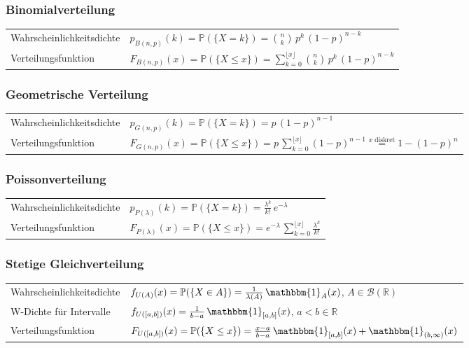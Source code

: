 \documentclass{article}
\begin{document}
\subsubsection*{Binomialverteilung}

\begin{tabular}{ll}
Wahrscheinlichkeitsdichte & $p_{B(n,p)}(k) = \mathbb{P}(\{X = k\}) = \binom{n}{k}\,p^k\,(1-p)^{n-k}$ \\
Verteilungsfunktion & $F_{B(n,p)}(x) = \mathbb{P}(\{X \le x\}) = \sum_{k=0}^{\lfloor x \rfloor} \binom{n}{k}\,p^k\,(1-p)^{n-k}$ \\
\end{tabular}

\subsubsection*{Geometrische Verteilung}

\begin{tabular}{ll}
Wahrscheinlichkeitsdichte & $p_{G(n,p)}(k) = \mathbb{P}(\{X = k\}) = p\,(1-p)^{n-1}$ \\
Verteilungsfunktion & $F_{G(n,p)}(x) = \mathbb{P}(\{X \le x\}) = p\, \sum_{k=0}^{\lfloor x \rfloor} (1-p)^{n-1} \overset{x\;\text{diskret}}{=} 1-(1-p)^n $ \\
\end{tabular}

\subsubsection*{Poissonverteilung}

\begin{tabular}{ll}
Wahrscheinlichkeitsdichte & $p_{P(\lambda)}(k) = \mathbb{P}(\{X = k\}) = \frac{\lambda^k}{k!}\, e^{-\lambda}$ \\
Verteilungsfunktion & $F_{P(\lambda)}(x) = \mathbb{P}(\{X \le x\}) =  e^{-\lambda}\, \sum_{k=0}^{\lfloor x \rfloor} \frac{\lambda^k}{k!}$ \\
\end{tabular}

\subsubsection*{Stetige Gleichverteilung}

\begin{tabular}{ll}
Wahrscheinlichkeitsdichte & $f_{U(A)}(x) = \mathbb{P}(\{X \in A\}) = \frac{1}{\lambda(A)}\, \mathbbm{1}_A(x)$, $A \in \mathcal{B}(\mathbb{R})$ \\
W-Dichte für Intervalle & $f_{U([a,b])}(x) = \frac{1}{b-a}\, \mathbbm{1}_{[a,b]}(x)$, $a < b \in \mathbb{R}$ \\
Verteilungsfunktion & $F_{U([a,b])}(x) = \mathbb{P}(\{X \le x\}) = \frac{x-a}{b-a}\, \mathbbm{1}_{[a,b]}(x) + \mathbbm{1}_{(b,\infty)}(x)$ \\
\end{tabular}
\end{document}
